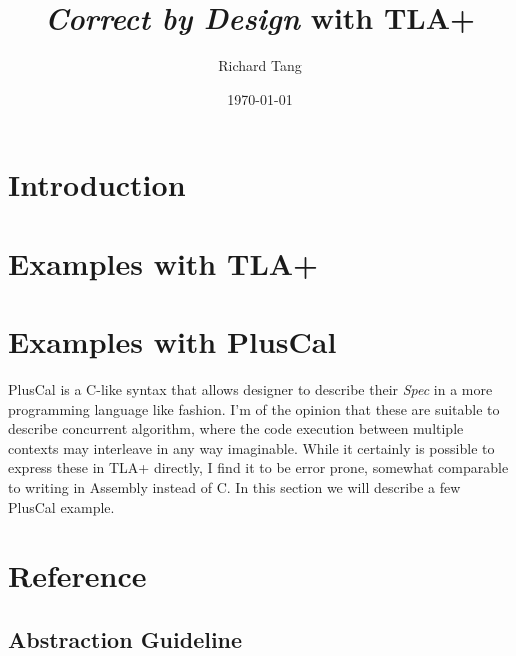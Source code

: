 \documentclass{report}
\title{\textit{Correct by Design} with TLA+}
\author{Richard Tang}
\date{\today}
\begin{document}
\maketitle
\tableofcontents

\part{Introduction}





\part{Examples with TLA+}











\part{Examples with PlusCal}

PlusCal is a C-like syntax that allows designer to describe their \textit{Spec}
in a more programming language like fashion. I'm of the opinion that these are
suitable to describe concurrent algorithm, where the code execution between
multiple contexts may interleave in any way imaginable. While it certainly is
possible to express these in TLA+ directly, I find it to be error prone,
somewhat comparable to writing in Assembly instead of C. In this section we will
describe a few PlusCal example.





\part{Reference}







\chapter{Abstraction Guideline}


\end{document}
